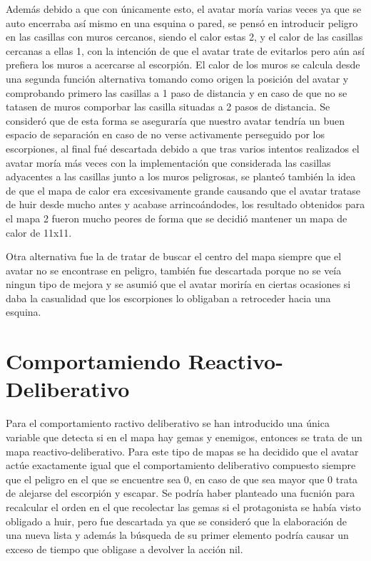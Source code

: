 Además debido a que con únicamente esto, el avatar moría varias veces ya que se auto encerraba así mismo en una esquina o pared, se pensó en introducir peligro en las casillas con muros cercanos, siendo el calor estas 2, y el calor de las casillas cercanas a ellas 1, con la intención de que el avatar trate de evitarlos pero aún así prefiera los muros a acercarse al escorpión. El calor de los muros se calcula desde una segunda función alternativa tomando como origen la posición del avatar y comprobando primero las casillas a 1 paso de distancia y en caso de que no se tatasen de muros comporbar las casilla situadas a 2 pasos de distancia. Se consideró que de esta forma se aseguraría que nuestro avatar tendría un buen espacio de separación en caso de no verse activamente perseguido por los escorpiones, al final fué descartada debido a que tras varios intentos realizados el avatar moría más veces con la implementación que considerada las casillas adyacentes a las casillas junto a los muros peligrosas, se planteó también la idea de que el mapa de calor era excesivamente grande causando que el avatar tratase de huir desde mucho antes y acabase arrincoándodes, los resultado obtenidos para el mapa 2 fueron mucho peores de forma que se decidió mantener un mapa de calor de 11x11.

Otra alternativa fue la de tratar de buscar el centro del mapa siempre que el avatar no se encontrase en peligro, también fue descartada porque no se veía ningun tipo de mejora y se asumió que el avatar moriría en ciertas ocasiones si daba la casualidad que los escorpiones lo obligaban a retroceder hacia una esquina.

\section{Comportamiendo Reactivo-Deliberativo}
Para el comportamiento ractivo deliberativo se han introducido una única variable que detecta si en el mapa hay gemas y enemigos, entonces se trata de un mapa reactivo-deliberativo. Para este tipo de mapas se ha decidido que el avatar actúe exactamente igual que el comportamiento deliberativo compuesto siempre que el peligro en el que se encuentre sea 0, en caso de que sea mayor que 0 trata de alejarse del escorpión y escapar. Se podría haber planteado una fucnión para recalcular el orden en el que recolectar las gemas si el protagonista se había visto obligado a huir, pero fue descartada ya que se consideró que la elaboración de una nueva lista y además la búsqueda de su primer elemento podría causar un exceso de tiempo que obligase a devolver la acción nil.

